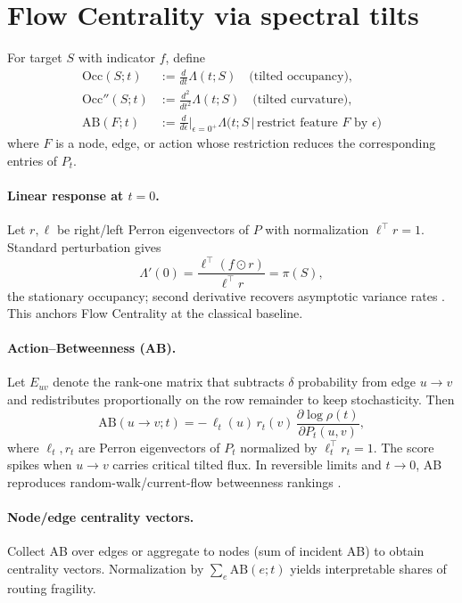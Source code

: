 \documentclass[11pt]{article}
\newcommand{\1}{\mathbbm{1}}
\begin{document}
\section{Flow Centrality via spectral tilts}\label{sec:centrality}
\begin{definition}
For target $S$ with indicator $f$, define
\begin{align*}
\text{Occ}(S;t) &:= \frac{d}{dt}\Lambda(t;S) \quad \text{(tilted occupancy)},\\
\text{Occ}''(S;t) &:= \frac{d^2}{dt^2}\Lambda(t;S) \quad \text{(tilted curvature)},\\
\text{AB}(F;t) &:= \frac{d}{d\epsilon}\Big|_{\epsilon=0^+} \Lambda\bigl(t;S\,\big|\,\text{restrict feature }F \text{ by } \epsilon\bigr)
\end{align*}
where $F$ is a node, edge, or action whose restriction reduces the corresponding entries of $P_t$.
\end{definition}

\paragraph{Linear response at $t=0$.}
Let $r,\ell$ be right/left Perron eigenvectors of $P$ with normalization $\ell^\top r=1$. Standard perturbation gives
\[
\Lambda'(0)=\frac{\ell^\top (f\odot r)}{\ell^\top r}=\pi(S),
\]
the stationary occupancy; second derivative recovers asymptotic variance rates \parencite{Chung1997,LevinPeresWilmer2009}. This anchors Flow Centrality at the classical baseline.

\paragraph{Action--Betweenness (AB).}
Let $E_{uv}$ denote the rank-one matrix that subtracts $\delta$ probability from edge $u\to v$ and redistributes proportionally on the row remainder to keep stochasticity. Then
\[
\text{AB}(u\!\to\! v;t)= -\,\ell_t(u)\, r_t(v)\,\frac{\partial \log \rho(t)}{\partial P_t(u,v)},
\]
where $\ell_t,r_t$ are Perron eigenvectors of $P_t$ normalized by $\ell_t^\top r_t=1$. The score spikes when $u\!\to\! v$ carries critical tilted flux. In reversible limits and $t\to 0$, AB reproduces random-walk/current-flow betweenness rankings \parencite{Newman2005,DoyleSnell1984}.

\paragraph{Node/edge centrality vectors.}
Collect AB over edges or aggregate to nodes (sum of incident AB) to obtain centrality vectors. Normalization by $\sum_{e}\text{AB}(e;t)$ yields interpretable shares of routing fragility.
\end{document}
